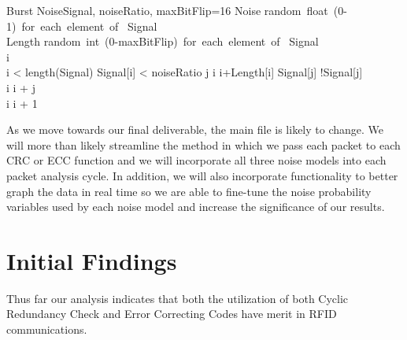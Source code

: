 \documentclass{sigcomm-alternate}
\begin{document}
\begin{pseudocode}{Burst Noise}{Signal, noiseRatio, maxBitFlip=16}
	Noise \GETS \mbox{random float (0-1) for each element of } Signal\\
	Length \GETS \mbox{random int (0-maxBitFlip) for each element of } Signal\\
	i \\	
	\WHILE i < length(Signal) \DO
		\BEGIN
			\IF Signal[i] < noiseRatio
			\THEN
				\BEGIN
					\FOR j \GETS i \TO i+Length[i] \DO
						\BEGIN
							Signal[j] \GETS !Signal[j]
						\END\\
					i \GETS i + j\\
				\END
			\ELSE
				i \GETS i + 1
		\END\\
\end{pseudocode}

As we move towards our final deliverable, the main file is likely to change. We will more than likely streamline the method in which we pass each packet to each CRC or ECC function and we will incorporate all three noise models into each packet analysis cycle. In addition, we will also incorporate functionality to better graph the data in real time so we are able to fine-tune the noise probability variables used by each noise model and increase the significance of our results.

\section{Initial Findings}
Thus far our analysis indicates that both the utilization of both Cyclic Redundancy Check and Error Correcting Codes have merit in RFID communications.

\end{document}
